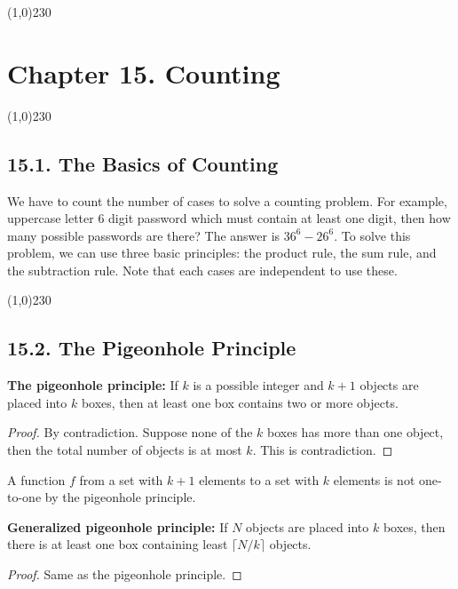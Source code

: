 

\begin{center}
\line(1,0){230}
\end{center}

\section*{Chapter 15. Counting}

\begin{center}
\line(1,0){230}
\end{center}

\subsection*{15.1. The Basics of Counting}

We have to count the number of cases to solve a counting problem. For example, uppercase letter 6 digit password which must contain at least one digit, then how many possible passwords are there? The answer is $36^6 - 26^6$. To solve this problem, we can use three basic principles: the product rule, the sum rule, and the subtraction rule. Note that each cases are independent to use these. 

\begin{center}
\line(1,0){230}
\end{center}

\subsection*{15.2. The Pigeonhole Principle}

\begin{theorem}
    \textbf{The pigeonhole principle: }If $k$ is a possible integer and $k+1$ objects are placed into $k$ boxes, then at least one box contains two or more objects.
\end{theorem}
\begin{proof}
    By contradiction. Suppose none of the $k$ boxes has more than one object, then the total number of objects is at most $k$. This is contradiction.
\end{proof}
\begin{corollary}
    A function $f$ from a set with $k+1$ elements to a set with $k$ elements is not one-to-one by the pigeonhole principle.
\end{corollary}

\begin{theorem}
    \textbf{Generalized pigeonhole principle: } If $N$ objects are placed into $k$ boxes, then there is at least one box containing least $\lceil N/k \rceil$ objects.
\end{theorem}
\begin{proof}
    Same as the pigeonhole principle.
\end{proof}

